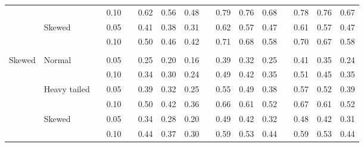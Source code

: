 \documentclass[12pt]{article} %
\begin{document}
\begin{table}[ht]
\begin{scriptsize}
\begin{center}
\begin{tabular}{ll p{.1cm} c p{.1cm} rrr p{.1cm} rrr p{.1cm} rrr}
             &              && 0.10 &&   0.62 & 0.56 & 0.48 && 0.79 & 0.76 & 0.68 &&  0.78 & 0.76 & 0.67 \\
             & Skewed       && 0.05 &&   0.41 & 0.38 & 0.31 && 0.62 & 0.57 & 0.47 &&  0.61 & 0.57 & 0.47 \\
             &              && 0.10 &&   0.50 & 0.46 & 0.42 && 0.71 & 0.68 & 0.58 &&  0.70 & 0.67 & 0.58 \\
             &&&&&&&&&&&&&&&\\
Skewed       & Normal       && 0.05 &&   0.25 & 0.20 & 0.16 && 0.39 & 0.32 & 0.25 && 0.41 & 0.35 & 0.24 \\
             &              && 0.10 &&   0.34 & 0.30 & 0.24 && 0.49 & 0.42 & 0.35 && 0.51 & 0.45 & 0.35 \\
             & Heavy tailed && 0.05 &&   0.39 & 0.32 & 0.25 && 0.55 & 0.49 & 0.38 && 0.57 & 0.52 & 0.39 \\
             &              && 0.10 &&   0.50 & 0.42 & 0.36 && 0.66 & 0.61 & 0.52 && 0.67 & 0.61 & 0.52 \\
             & Skewed       && 0.05 &&   0.34 & 0.28 & 0.20 && 0.49 & 0.42 & 0.32 && 0.48 & 0.42 & 0.31 \\
             &              && 0.10 &&   0.44 & 0.37 & 0.30 && 0.59 & 0.53 & 0.44 && 0.59 & 0.53 & 0.44 \\



\end{tabular}
\end{center}
\end{scriptsize}
\end{table}
\end{document}
